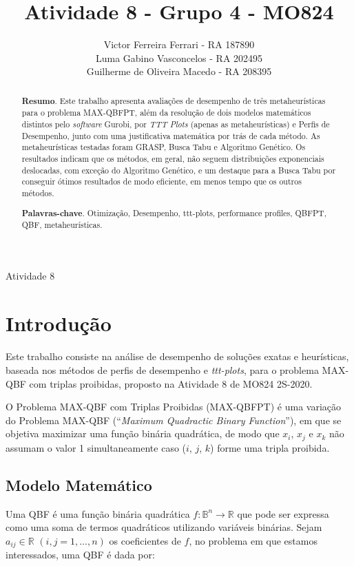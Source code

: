 \documentclass{MO824}
\title{Atividade 8 - Grupo 4 - MO824}
\author{
    Victor Ferreira Ferrari      - RA 187890\\
    Luma Gabino Vasconcelos      - RA 202495 \\
    Guilherme de Oliveira Macedo - RA 208395
}
\newcommand{\B}{\mathbb{B}}
\newcommand{\R}{\mathbb{R}}
\begin{document}
\criartitulo

%
{Atividade 8}

\begin{abstract}
{\bf Resumo}. Este trabalho apresenta avaliações de desempenho de três metaheurísticas para o problema MAX-QBFPT, além da resolução de dois modelos matemáticos distintos pelo \textit{software} Gurobi, por \textit{TTT Plots} (apenas as metaheurísticas) e Perfis de Desempenho, junto com uma justificativa matemática por trás de cada método. As metaheurísticas testadas foram GRASP, Busca Tabu e Algoritmo Genético. Os resultados indicam que os métodos, em geral, não seguem distribuições exponenciais deslocadas, com exceção do Algoritmo Genético, e um destaque para a Busca Tabu por conseguir ótimos resultados de modo eficiente, em menos tempo que os outros métodos.

{\bf Palavras-chave}. Otimização, Desempenho, ttt-plots, performance profiles, QBFPT, QBF, metaheurísticas.

\end{abstract}

\section{Introdução}
    \paragraph*{}
    Este trabalho consiste na análise de desempenho de soluções exatas e heurísticas, baseada nos métodos de perfis de desempenho e \textit{ttt-plots}, para o problema MAX-QBF com triplas proibidas, proposto na Atividade 8 de MO824 2S-2020. 
    
    O Problema MAX-QBF com Triplas Proibidas (MAX-QBFPT) é uma variação do Problema  MAX-QBF (``\textit{Maximum Quadractic Binary Function}''), em que se objetiva maximizar uma função binária quadrática, de modo que $x_i$, $x_j$ e $x_k$ não assumam o valor 1 simultaneamente caso ($i$, $j$, $k$) forme uma tripla proibida. 
    
    \subsection{Modelo Matemático}
    Uma QBF é uma função binária quadrática $f:\B^n \rightarrow \R$ que pode ser expressa como uma soma de termos quadráticos utilizando variáveis binárias. Sejam~$a_{ij} \in \mathbb{R}$ $(i,j = 1,\dots,n)$ os coeficientes de $f$, no problema em que estamos interessados, uma QBF é dada por:
    
\end{document}
